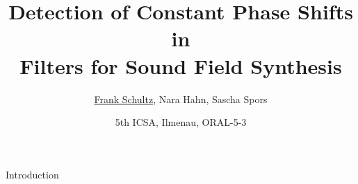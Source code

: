 \documentclass[mathserif]{intbeamer}
\title[Audibility Constant Phase Shifts]%
  {Detection of Constant Phase Shifts in\\Filters for Sound Field Synthesis}
\author[Schultz et al.]{%
    \underline{Frank Schultz},
    Nara Hahn,
    Sascha Spors
}
\date[2019-09-28]{%
  5th ICSA, Ilmenau, ORAL-5-3\\
}
\institute[]{Institute of Communications Engineering, University of Rostock}
\begin{document}
\maketitle
\begin{frame}{Introduction}
\end{frame}
\end{document}
